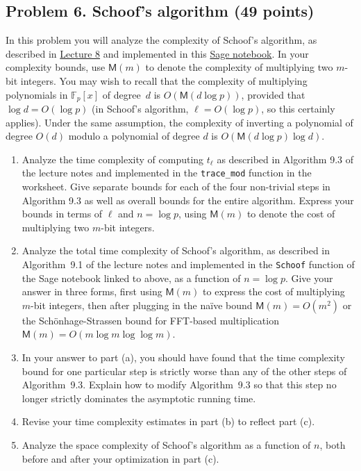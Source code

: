 \documentclass[11pt]{article}
\newcommand{\Fp}{\mathbb{F}_p}
\newcommand{\M}{\textsf{M}}
\begin{document}
\subsection*{Problem 6. Schoof's algorithm (49 points)}
In this problem you will analyze the complexity of Schoof's algorithm, as described in \href{https://math.mit.edu/classes/18.783/2021/LectureNotes8.pdf}{Lecture 8} and implemented in this \href{https://cocalc.com/share/public_paths/600832aafc89f1098d5415b39eec4fbaa63ccab1}{Sage notebook}.
In your complexity bounds, use $\M(m)$ to denote the complexity of multiplying two $m$-bit integers.
You may wish to recall that the complexity of multiplying polynomials in $\Fp[x]$ of degree~$d$ is $O(\M(d\log p))$, provided that $\log d = O(\log p)$ (in Schoof's algorithm, $\ell=O(\log p)$, so this certainly applies).
Under the same assumption, the complexity of inverting a polynomial of degree $O(d)$ modulo a polynomial of degree $d$ is $O(\M(d\log p)\log d)$.

\begin{enumerate}[{\bf (a)}]
\item Analyze the time complexity of computing $t_\ell$ as described in Algorithm 9.3 of the lecture notes and implemented in the \texttt{trace\_mod} function in the worksheet.
Give separate bounds for each of the four non-trivial steps in Algorithm 9.3 as well as overall bounds for the entire algorithm.
Express your bounds in terms of $\ell$ and $n=\log p$, using $\M(m)$ to denote the cost of multiplying two $m$-bit integers.

\item Analyze the total time complexity of Schoof's algorithm, as described in Algorithm~9.1 of the lecture notes and implemented in the \texttt{Schoof} function of the Sage notebook linked to above, as a function of $n=\log p$.
Give your answer in three forms, first using $\M(m)$ to express the cost of multiplying $m$-bit integers, then after plugging in the na\"ive bound $\M(m)=O(m^2)$ or the Sch\"onhage-Strassen bound for FFT-based multiplication $\M(m)=O(m\log m\log\log m)$.

\item In your answer to part (a), you should have found that the time complexity bound for one particular step is strictly worse than any of the other steps of Algorithm~9.3.
Explain how to modify Algorithm~9.3 so that this step no longer strictly dominates the asymptotic running time.

\item Revise your time complexity estimates in part (b) to reflect part (c).

\item Analyze the space complexity of Schoof's algorithm as a function of $n$, both before and after your optimization in part (c).
\end{enumerate}
\end{document}
